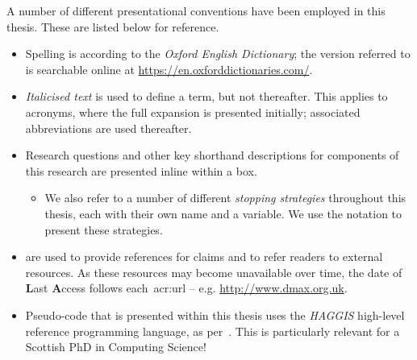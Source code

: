 
\begin{preamble}
{}

A number of different presentational conventions have been employed in this thesis. These are listed below for reference.


\begin{itemize}
    
    \item{Spelling is according to the \emph{Oxford English Dictionary}; the version referred to is searchable online at \url{https://en.oxforddictionaries.com/}.}
    
    \item{\emph{Italicised text} is used to define a term, but not thereafter. This applies to acronyms, where the full expansion is presented initially; associated abbreviations are used thereafter.}
    
    \item{Research questions and other key shorthand descriptions for components of this research are presented inline within a  box.}
    
    \begin{itemize}
        
        \item{We also refer to a number of different \emph{stopping strategies} throughout this thesis, each with their own name and a variable. We use the notation  to present these strategies.}
        
    \end{itemize}
    
    \item{ are used to provide references for claims and to refer readers to external resources. As these resources may become unavailable over time, the date of \textbf{L}ast \textbf{A}ccess follows each~\gls{acr:url} -- e.g. \url{http://www.dmax.org.uk}.}
    
    \item{Pseudo-code that is presented within this thesis uses the \emph{HAGGIS} high-level reference programming language, as per~\cite{cutts2014haggis}. This is particularly relevant for a Scottish PhD in Computing Science!}
    

\end{itemize}
\end{preamble}
